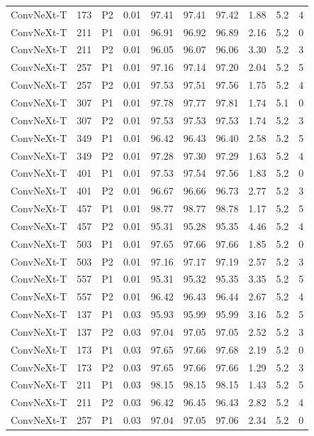 {\begin{longtable}{lrllrrrrrr}
ConvNeXt-T & 173 & P2 & 0.01 & 97.41 & 97.41 & 97.42 & 1.88 & 5.2 & 4 \\
ConvNeXt-T & 211 & P1 & 0.01 & 96.91 & 96.92 & 96.89 & 2.16 & 5.2 & 0 \\
ConvNeXt-T & 211 & P2 & 0.01 & 96.05 & 96.07 & 96.06 & 3.30 & 5.2 & 3 \\
ConvNeXt-T & 257 & P1 & 0.01 & 97.16 & 97.14 & 97.20 & 2.04 & 5.2 & 5 \\
ConvNeXt-T & 257 & P2 & 0.01 & 97.53 & 97.51 & 97.56 & 1.75 & 5.2 & 4 \\
ConvNeXt-T & 307 & P1 & 0.01 & 97.78 & 97.77 & 97.81 & 1.74 & 5.1 & 0 \\
ConvNeXt-T & 307 & P2 & 0.01 & 97.53 & 97.53 & 97.53 & 1.74 & 5.2 & 3 \\
ConvNeXt-T & 349 & P1 & 0.01 & 96.42 & 96.43 & 96.40 & 2.58 & 5.2 & 5 \\
ConvNeXt-T & 349 & P2 & 0.01 & 97.28 & 97.30 & 97.29 & 1.63 & 5.2 & 4 \\
ConvNeXt-T & 401 & P1 & 0.01 & 97.53 & 97.54 & 97.56 & 1.83 & 5.2 & 0 \\
ConvNeXt-T & 401 & P2 & 0.01 & 96.67 & 96.66 & 96.73 & 2.77 & 5.2 & 3 \\
ConvNeXt-T & 457 & P1 & 0.01 & 98.77 & 98.77 & 98.78 & 1.17 & 5.2 & 5 \\
ConvNeXt-T & 457 & P2 & 0.01 & 95.31 & 95.28 & 95.35 & 4.46 & 5.2 & 4 \\
ConvNeXt-T & 503 & P1 & 0.01 & 97.65 & 97.66 & 97.66 & 1.85 & 5.2 & 0 \\
ConvNeXt-T & 503 & P2 & 0.01 & 97.16 & 97.17 & 97.19 & 2.57 & 5.2 & 3 \\
ConvNeXt-T & 557 & P1 & 0.01 & 95.31 & 95.32 & 95.35 & 3.35 & 5.2 & 5 \\
ConvNeXt-T & 557 & P2 & 0.01 & 96.42 & 96.43 & 96.44 & 2.67 & 5.2 & 4 \\
ConvNeXt-T & 137 & P1 & 0.03 & 95.93 & 95.99 & 95.99 & 3.16 & 5.2 & 5 \\
ConvNeXt-T & 137 & P2 & 0.03 & 97.04 & 97.05 & 97.05 & 2.52 & 5.2 & 3 \\
ConvNeXt-T & 173 & P1 & 0.03 & 97.65 & 97.66 & 97.68 & 2.19 & 5.2 & 0 \\
ConvNeXt-T & 173 & P2 & 0.03 & 97.65 & 97.66 & 97.66 & 1.29 & 5.2 & 3 \\
ConvNeXt-T & 211 & P1 & 0.03 & 98.15 & 98.15 & 98.15 & 1.43 & 5.2 & 5 \\
ConvNeXt-T & 211 & P2 & 0.03 & 96.42 & 96.45 & 96.43 & 2.82 & 5.2 & 4 \\
ConvNeXt-T & 257 & P1 & 0.03 & 97.04 & 97.05 & 97.06 & 2.34 & 5.2 & 0 \\

\end{longtable}}
